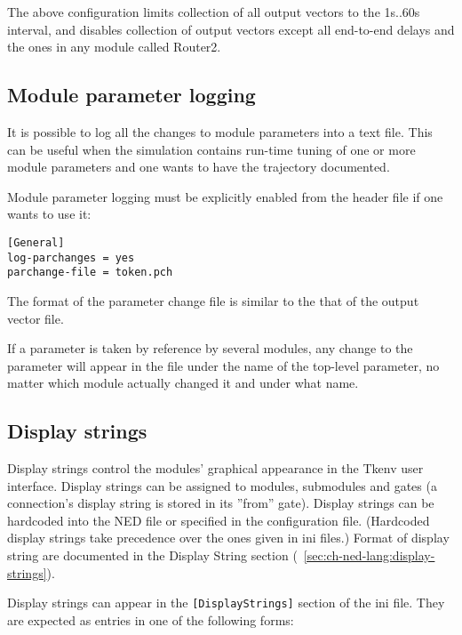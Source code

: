 The above configuration limits collection of all output vectors 
to the 1s..60s interval, and disables collection of output vectors 
except all end-to-end delays and the ones in any module called Router2.



\subsection{Module parameter logging}

It is possible to log all the changes to module parameters into a text
file. This can be useful when the
simulation contains run-time tuning of one or more module parameters
and one wants to have the trajectory documented.


Module parameter logging must be explicitly enabled from the 
header file if one wants to use it:

\begin{Verbatim}
[General]
log-parchanges = yes
parchange-file = token.pch
\end{Verbatim}


The format of the parameter change file is similar to the that 
of the output vector file.

If a parameter is taken by reference by
several modules, any change to the parameter will appear in the file
under the name of the top-level parameter, no matter which module
actually changed it and under what name.





\subsection{Display strings}

Display strings control the modules' graphical
appearance in the Tkenv user interface. Display strings can be
assigned to modules, submodules and gates (a connection's display
string is stored in its ''from'' gate). Display strings can be
hardcoded into the NED file or specified in the configuration file.
(Hardcoded display strings take precedence over the ones given in ini
files.) Format of display string are documented in the Display String
section (~\ref{sec:ch-ned-lang:display-strings}).

Display strings can appear in the \texttt{[DisplayStrings]} section of 
the ini file. They are expected as entries in one of the following 
forms:

